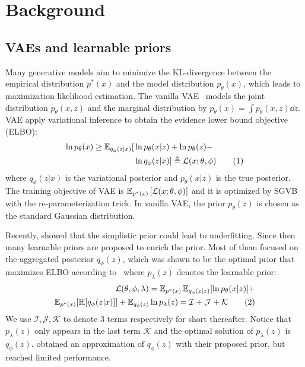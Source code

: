 \section{Background}

\subsection{VAEs and learnable priors}

Many generative models aim to minimize the KL-divergence between the empirical distribution $p^*(x)$ and the model distribution $p_\theta(x)$, which leads to maximization likelihood estimation. The vanilla VAE~\cite{kingma2014auto} models the joint distribution $p_\theta(x, z)$ and the marginal distribution by $p_\theta(x) = \int p_\theta(x, z) \dd z$. VAE apply variational inference to obtain the evidence lower bound objective (ELBO): 
\begin{align*} \label{eq:ELBO}
\ln p_\theta(x) \geq \operatorname{\mathbb{E}}_{q_\phi(z|x)} [  &  \ln p_\theta(x|z) + \ln p_\theta(z) - \\ & \ln q_\phi(z|x) ] 
\triangleq \mathcal{L}(x; \theta, \phi) \tag{1}
\end{align*}
where $q_\phi(z|x)$ is the variational posterior and $p_\theta(x|z)$ is the true posterior. The training objective of VAE is $\operatorname{\mathbb{E}}_{{p^*(x)}}\left[{\mathcal{L}(x; \theta, \phi)}\right]$ and it is optimized by SGVB with the re-parameterization trick. In vanilla VAE, the prior $p_\theta(z)$ is chosen as the standard Gaussian distribution. 

Recently, \cite{tomczak2018vae} showed that the simplistic prior could lead to underfitting. Since then many learnable priors are proposed to enrich the prior. Most of them focused on the aggregated posterior $q_\phi(z)$, which was shown to be the optimal prior that maximizes ELBO according to~\cite{tomczak2018vae} where $p_\lambda(z)$ denotes the learnable prior:
\begin{align*} \label{eq:second-decomposition}
\mathcal{L}(\theta, \phi, \lambda) = \operatorname{\mathbb{E}}_{p^*(x)}\operatorname{\mathbb{E}}_{q_\phi(z|x)} [ \ln p_\theta(x|z)] + \\ 
\operatorname{\mathbb{E}}_{p^*(x)}[\mathbb{H}[q_\phi(z|x)]] + \operatorname{\mathbb{E}}_{q_\phi(z)} \ln p_\lambda(z) = \mathcal{I} + \mathcal{J} + \mathcal{K} \tag{2}
\end{align*}
We use $\mathcal{I}, \mathcal{J}, \mathcal{K}$ to denote 3 terms respectively for short thereafter. 
Notice that $p_\lambda(z)$ only appears in the last term $\mathcal{K}$ and the optimal solution of $p_\lambda(z)$ is $q_\phi(z)$. \cite{tomczak2018vae,takahashi2019variational} obtained an approximation of $q_\phi(z)$ with their proposed prior, but reached limited performance. 

